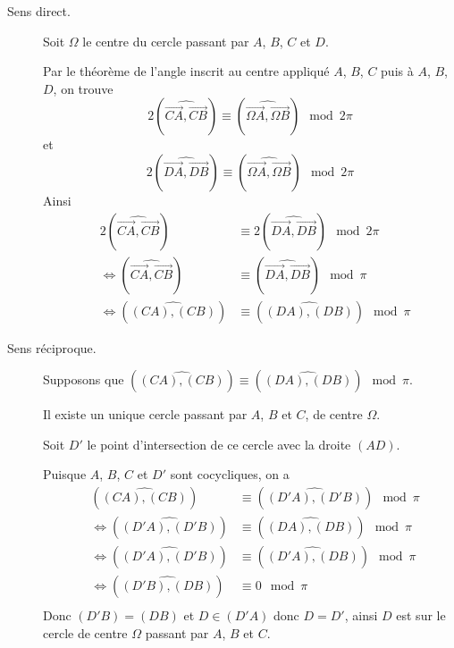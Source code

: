 \documentclass[a4paper, 12pt]{article}
\begin{document}
\tikzexternalenable
\begin{figure}[H]
    \centering
    \resizebox{0.9\textwidth}{!}{%
    
    }
\end{figure}
\tikzexternaldisable

\begin{demonstration}
    \begin{description}
        \item[Sens direct.]
        Soit $\Omega$ le centre du cercle passant par $A$, $B$, $C$ et $D$.

        Par le théorème de l'angle inscrit au centre appliqué $A$, $B$, $C$ puis à $A$, $B$, $D$, on trouve
        $$
        2(\widehat{\overrightarrow{CA}, \overrightarrow{CB}}) \equiv (\widehat{\overrightarrow{\Omega A}, \overrightarrow{\Omega B}}) \mod 2\pi
        $$
        et
        $$
        2(\widehat{\overrightarrow{DA}, \overrightarrow{DB}}) \equiv (\widehat{\overrightarrow{\Omega A}, \overrightarrow{\Omega B}}) \mod 2\pi
        $$
        Ainsi
        \begin{align*}
            &2(\widehat{\overrightarrow{CA}, \overrightarrow{CB}}) &\equiv 2(\widehat{\overrightarrow{DA}, \overrightarrow{DB}}) \mod 2\pi \\
            &\iff (\widehat{\overrightarrow{CA}, \overrightarrow{CB}}) &\equiv (\widehat{\overrightarrow{DA}, \overrightarrow{DB}}) \mod \pi \\
            &\iff (\widehat{(CA), (CB)}) &\equiv (\widehat{(DA), (DB)}) \mod \pi
        \end{align*}

        \item[Sens réciproque.]
        Supposons que $(\widehat{(CA), (CB)}) \equiv (\widehat{(DA), (DB)}) \mod \pi$.

        Il existe un unique cercle passant par $A$, $B$ et $C$, de centre $\Omega$.

        Soit $D'$ le point d'intersection de ce cercle avec la droite $(AD)$.

        Puisque $A$, $B$, $C$ et $D'$ sont cocycliques, on a
        \begin{align*}
            &(\widehat{(CA), (CB)}) &\equiv (\widehat{(D'A), (D'B)}) \mod \pi \\
            &\iff (\widehat{(D'A), (D'B)}) &\equiv (\widehat{(DA), (DB)}) \mod \pi \\
            &\iff (\widehat{(D'A), (D'B)}) &\equiv (\widehat{(D'A), (DB)}) \mod \pi \\
            &\iff (\widehat{(D'B), (DB)}) &\equiv 0 \mod \pi \\
        \end{align*}
        Donc $(D'B) = (DB)$ et $D \in (D'A)$ donc $D = D'$, ainsi $D$ est sur le cercle de centre $\Omega$ passant par $A$, $B$ et $C$.
    \end{description}
\end{demonstration}
\end{document}
